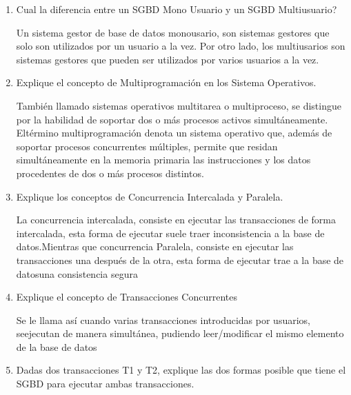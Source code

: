 \begin{enumerate}
\item Cual la diferencia entre un SGBD  Mono Usuario y un SGBD Multiusuario?

Un sistema gestor de base de datos monousario, son sistemas gestores que solo son utilizados por un usuario a la vez. Por otro lado, los multiusarios son sistemas gestores que pueden ser utilizados por varios usuarios a la vez.

\item Explique el concepto de Multiprogramación en los Sistema Operativos.

También llamado sistemas operativos multitarea o multiproceso, se distingue por la habilidad de soportar dos o más procesos activos simultáneamente. Eltérmino multiprogramación denota un sistema operativo que, además de soportar procesos concurrentes múltiples, permite que residan simultáneamente en la memoria primaria las instrucciones y los datos procedentes de dos o más procesos distintos.

\item Explique los conceptos de Concurrencia Intercalada y Paralela.

La concurrencia intercalada, consiste en ejecutar las transacciones de forma intercalada, esta forma de ejecutar suele traer inconsistencia a la base de datos.Mientras que concurrencia Paralela, consiste en ejecutar las transacciones una después de la otra, esta forma de ejecutar trae a la base de datosuna consistencia segura

\item Explique el concepto de Transacciones Concurrentes

Se le llama así cuando varias transacciones introducidas por usuarios, seejecutan de manera simultánea, pudiendo leer/modificar el mismo elemento de la base de datos

\item Dadas dos transacciones T1 y T2, explique las dos formas posible que tiene el SGBD para ejecutar ambas transacciones.


\end{enumerate}
